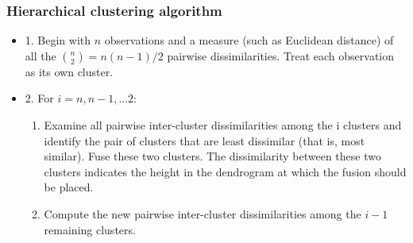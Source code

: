 \documentclass{beamer}
\begin{document}
                   \begin{frame}
                   	\frametitle{ Hierarchical clustering algorithm}
                   	\begin{itemize}
                   		\item  
                   		1. Begin with $n$ observations and a measure (such as Euclidean distance)
                   		of all the
                   	  ${n \choose 2} = n(n-1)/2   $ pairwise dissimilarities. Treat each
                   		observation as its own cluster.
                   	\item 	2. For $i=n, n-1, ...2$:
                   	\begin{enumerate} 
                   		\item 
                   		  Examine all pairwise inter-cluster dissimilarities among the i
                   		clusters and identify the pair of clusters that are least dissimilar
                   		(that is, most similar). Fuse these two clusters. The dissimilarity
                   		between these two clusters indicates the height in the dendrogram
                   		at which the fusion should be placed.
                   		\item  Compute the new pairwise inter-cluster dissimilarities among
                   		the $i -1$ remaining clusters.
                   		 
                   	\end{enumerate}	 
                   		
      
                   		
                   	\end{itemize}
                   \end{frame}   
                   
                  
             
\end{document}
